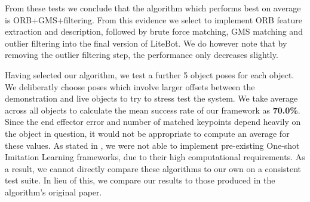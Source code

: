 
From these tests we conclude that the algorithm which performs best on average is ORB+GMS+filtering. From this evidence we select to implement ORB feature extraction and description, followed by brute force matching, GMS matching and outlier filtering into the final version of LiteBot. We do however note that by removing the outlier filtering step, the performance only decreases slightly. 

Having selected our algorithm, we test a further 5 object poses for each object. We deliberatly choose poses which involve larger offsets between the demonstration and live objects to try to stress test the system. We take average across all objects to calculate the mean success rate of our framework as \textbf{70.0\%}. Since the end effector error and number of matched keypoints depend heavily on the object in question, it would not be appropriate to compute an average for these values. As stated in , we were not able to implement pre-existing One-shot Imitation Learning frameworks, due to their high computational requirements. As a result, we cannot directly compare these algorithms to our own on a consistent test suite. In lieu of this, we compare our results to those produced in the algorithm's original paper.\\


